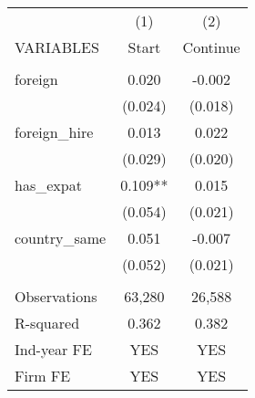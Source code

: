 \begin{tabular}{lcc} \hline
 & (1) & (2) \\
VARIABLES & Start & Continue \\ \hline
 &  &  \\
foreign & 0.020 & -0.002 \\
 & (0.024) & (0.018) \\
foreign\_hire & 0.013 & 0.022 \\
 & (0.029) & (0.020) \\
has\_expat & 0.109** & 0.015 \\
 & (0.054) & (0.021) \\
country\_same & 0.051 & -0.007 \\
 & (0.052) & (0.021) \\
 &  &  \\
Observations & 63,280 & 26,588 \\
R-squared & 0.362 & 0.382 \\
Ind-year FE & YES & YES \\
 Firm FE & YES & YES \\ \hline
\end{tabular}
